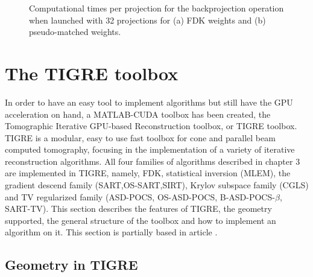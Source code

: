 \begin{figure}
\centering
{}

\caption[Computational times of the backprojection operator, multiple projections]{\label{fig:backprojection32times} Computational times per projection for the backprojection operation when launched with 32 projections for (a) FDK weights and (b) pseudo-matched weights.} 
\end{figure}


\FloatBarrier
\section{The TIGRE toolbox}

In order to have an easy tool to implement algorithms but still have the GPU acceleration on hand, a MATLAB-CUDA toolbox has been created, the Tomographic Iterative GPU-based Reconstruction toolbox, or TIGRE toolbox. TIGRE is a modular, easy to use fast toolbox for cone and parallel beam computed tomography, focusing in the implementation of a variety of iterative reconstruction algorithms. All four families of algorithms described in chapter 3 are implemented in TIGRE, namely, FDK, statistical inversion (MLEM), the gradient descend family (SART,OS-SART,SIRT), Krylov subspace family (CGLS) and TV regularized family (\mbox{ASD-POCS},  \mbox{OS-ASD-POCS}, \mbox{B-ASD-POCS-$\beta$}, SART-TV). This section describes the features of TIGRE, the geometry supported, the general structure of the toolbox and how to implement an algorithm on it. This section is partially based in article \cite{TIGRE}.

\subsection{Geometry in TIGRE}


